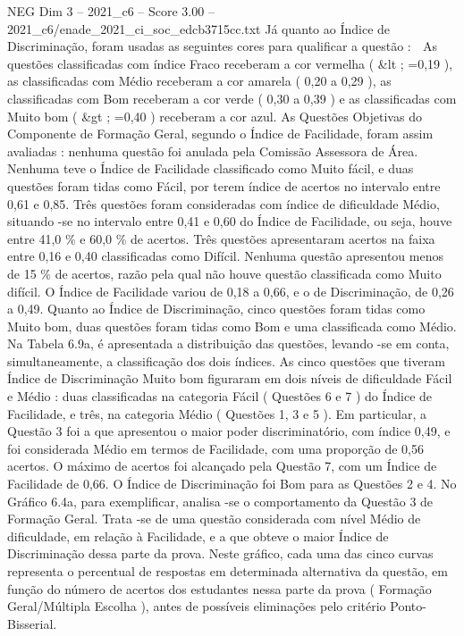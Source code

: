 \begin{textsample}{NEG Dim 3 – 2021\_c6 – Score 3.00 – 2021\_c6/enade\_2021\_ci\_soc\_edcb3715cc.txt}
Já quanto ao Índice de Discriminação, foram usadas as seguintes cores para qualificar a questão :  As questões classificadas com índice Fraco receberam a cor vermelha ( \&lt ; =0,19 ), as classificadas com Médio receberam a cor amarela ( 0,20 a 0,29 ), as classificadas com Bom receberam a cor verde ( 0,30 a 0,39 ) e as classificadas com Muito bom ( \&gt ; =0,40 ) receberam a cor azul.
As Questões Objetivas do Componente de Formação Geral, segundo o Índice de Facilidade, foram assim avaliadas : nenhuma questão foi anulada pela Comissão Assessora de Área.
Nenhuma teve o Índice de Facilidade classificado como Muito fácil, e duas questões foram tidas como Fácil, por terem índice de acertos no intervalo entre 0,61 e 0,85.
Três questões foram consideradas com índice de dificuldade Médio, situando -se no intervalo entre 0,41 e 0,60 do Índice de Facilidade, ou seja, houve entre 41,0 \% e 60,0 \% de acertos.
Três questões apresentaram acertos na faixa entre 0,16 e 0,40 classificadas como Difícil.
Nenhuma questão apresentou menos de 15 \% de acertos, razão pela qual não houve questão classificada como Muito difícil.
O Índice de Facilidade variou de 0,18 a 0,66, e o de Discriminação, de 0,26 a 0,49.
Quanto ao Índice de Discriminação, cinco questões foram tidas como Muito bom, duas questões foram tidas como Bom e uma classificada como Médio.
Na Tabela 6.9a, é apresentada a distribuição das questões, levando -se em conta, simultaneamente, a classificação dos dois índices.
As cinco questões que tiveram Índice de Discriminação Muito bom figuraram em dois níveis de dificuldade Fácil e Médio : duas classificadas na categoria Fácil ( Questões 6 e 7 ) do Índice de Facilidade, e três, na categoria Médio ( Questões 1, 3 e 5 ).
Em particular, a Questão 3 foi a que apresentou o maior poder discriminatório, com índice 0,49, e foi considerada Médio em termos de Facilidade, com uma proporção de 0,56 acertos.
O máximo de acertos foi alcançado pela Questão 7, com um Índice de Facilidade de 0,66.
O Índice de Discriminação foi Bom para as Questões 2 e 4.
No Gráfico 6.4a, para exemplificar, analisa -se o comportamento da Questão 3 de Formação Geral.
Trata -se de uma questão considerada com nível Médio de dificuldade, em relação à Facilidade, e a que obteve o maior Índice de Discriminação dessa parte da prova.
Neste gráfico, cada uma das cinco curvas representa o percentual de respostas em determinada alternativa da questão, em função do número de acertos dos estudantes nessa parte da prova ( Formação Geral/Múltipla Escolha ), antes de possíveis eliminações pelo critério Ponto-Bisserial.

\end{textsample}
